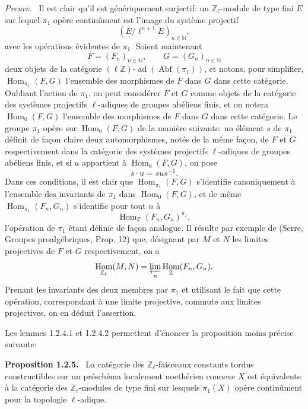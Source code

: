 \documentclass[11pt]{article}
\newenvironment{statement}[1]{\par\medskip\noindent\textbf{#1.}\ }{\par\medskip}
\newenvironment{prooftext}[1][Proof]{\par\noindent\emph{#1.}\ }{\par\medskip}
\DeclareMathOperator{\Hom}{Hom}
\providecommand{\Hom}{\operatorname{Hom}}
\providecommand{\Abf}{\operatorname{Abf}}
\providecommand{\ad}{\operatorname{ad}}
\begin{document}
\begin{prooftext}[Preuve]
Il est clair qu'il est génériquement surjectif: un \(\mathbb Z_\ell\)-module de type fini \(E\) sur lequel \(\pi_1\) opère continûment est l'image du système projectif
\[
(E/\ell^{n+1}E)_{n\in\mathbb N},
\]
avec les opérations évidentes de \(\pi_1\). Soient maintenant
\[
F=(F_n)_{n\in\mathbb N},\qquad G=(G_n)_{n\in\mathbb N}
\]
deux objets de la catégorie \((\ell\mathbb Z)\text{-}\ad(\Abf(\pi_1))\), et notons, pour simplifier, \(\Hom_{\pi_1}(F,G)\) l'ensemble des morphismes de \(F\) dans \(G\) dans cette catégorie. Oubliant l'action de \(\pi_1\), on peut considérer \(F\) et \(G\) comme objets de la catégorie des systèmes projectifs \(\ell\)-adiques de groupes abéliens finis, et on notera \(\Hom_0(F,G)\) l'ensemble des morphismes de \(F\) dans \(G\) dans cette catégorie. Le groupe \(\pi_1\) opère sur \(\Hom_0(F,G)\) de la manière suivante: un élément \(s\) de \(\pi_1\) définit de façon claire deux automorphismes, notés de la même façon, de \(F\) et \(G\) respectivement dans la catégorie des systèmes projectifs \(\ell\)-adiques de groupes abéliens finis, et si \(u\) appartient à \(\Hom_0(F,G)\), on pose
\[
s\cdot u=sus^{-1}.
\]
Dans ces conditions, il est clair que \(\Hom_{\pi_1}(F,G)\) s'identifie canoniquement à l'ensemble des invariants de \(\pi_1\) dans \(\Hom_0(F,G)\), et de même \(\Hom_{\pi_1}(F_n,G_n)\) s'identifie pour tout \(n\) à
\[
\Hom_{\mathbb Z}(F_n,G_n)^{\pi_1},
\]
l'opération de \(\pi_1\) étant définie de façon analogue. Il résulte par exemple de (Serre, Groupes proalgébriques, Prop. 12) que, désignant par \(M\) et \(N\) les limites projectives de \(F\) et \(G\) respectivement, on a
\[
\Hom_{\mathbb Z_\ell}(M,N)=\varprojlim_n\Hom_{\mathbb Z}(F_n,G_n).
\]
Prenant les invariants des deux membres par \(\pi_1\) et utilisant le fait que cette opération, correspondant à une limite projective, commute aux limites projectives, on en déduit l'assertion.
\end{prooftext}

Les lemmes 1.2.4.1 et 1.2.4.2 permettent d'énoncer la proposition moins précise suivante:

\begin{statement}{Proposition 1.2.5}
La catégorie des \(\mathbb Z_\ell\)-faisceaux constants tordus constructibles sur un préschéma localement noethérien connexe \(X\) est équivalente à la catégorie des \(\mathbb Z_\ell\)-modules de type fini sur lesquels \(\pi_1(X)\) opère continûment pour la topologie \(\ell\)-adique.
\end{statement}
\end{document}
